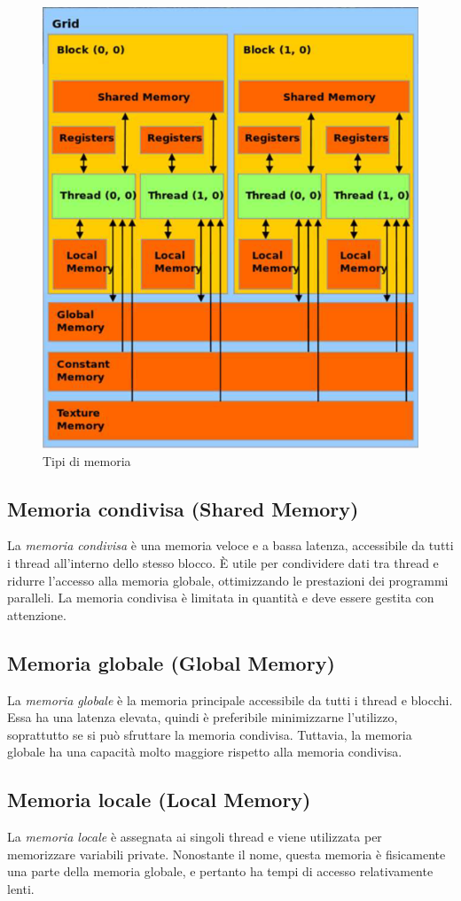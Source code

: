 \documentclass[12pt,a4paper]{report}
\begin{document}
\begin{figure}[h]
    \centering
    \includegraphics[width=0.7\linewidth]{img/type_of_memory.png}
    \caption{Tipi di memoria \cite{CUDAtutorial}}
\end{figure}


\subsection{Memoria condivisa (Shared Memory)}
La \textit{memoria condivisa} è una memoria veloce e a bassa latenza, accessibile da tutti i thread all'interno dello stesso blocco. È utile per condividere dati tra thread e ridurre l'accesso alla memoria globale, ottimizzando le prestazioni dei programmi paralleli. La memoria condivisa è limitata in quantità e deve essere gestita con attenzione.

\subsection{Memoria globale (Global Memory)}
La \textit{memoria globale} è la memoria principale accessibile da tutti i thread e blocchi. Essa ha una latenza elevata, quindi è preferibile minimizzarne l'utilizzo, soprattutto se si può sfruttare la memoria condivisa. Tuttavia, la memoria globale ha una capacità molto maggiore rispetto alla memoria condivisa.

\subsection{Memoria locale (Local Memory)}
La \textit{memoria locale} è assegnata ai singoli thread e viene utilizzata per memorizzare variabili private. Nonostante il nome, questa memoria è fisicamente una parte della memoria globale, e pertanto ha tempi di accesso relativamente lenti.
\end{document}
